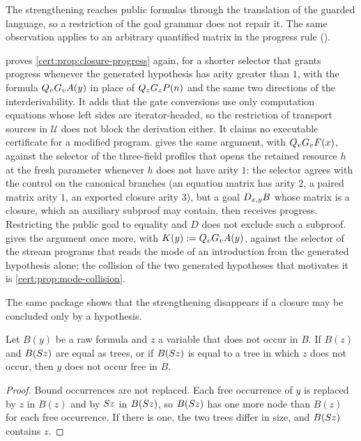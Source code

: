 The strengthening reaches public formulas through the translation of the
guarded language, so a restriction of the goal grammar does not repair it.
The same observation applies to an arbitrary quantified matrix in the
progress rule ().

\begin{remark}\label{cert:rem:closure-progress-sources}
 proves \cref{cert:prop:closure-progress} again,
for a shorter selector that grants progress whenever the generated hypothesis
has arity greater than $1$, with the formula $Q_{v}G_vA(y)$ in place of
$Q_{z}G_zP(n)$ and the same two directions of the interderivability. It adds
that the gate conversions use only computation equations whose left sides are
iterator-headed, so the restriction of transport sources in $\mathcal U$ does
not block the derivation either. It claims no executable certificate for a
modified program.  gives the same argument, with
$Q_{v}G_vF(x)$, against the selector of the three-field profiles that opens
the retained resource $h$ at the fresh parameter whenever $h$ does not have
arity $1$: the selector agrees with the control on the canonical branches
(an equation matrix has arity $2$, a paired matrix arity $1$, an exported
closure arity $3$), but a goal $D_{x,y}B$ whose matrix is a closure, which an
auxiliary subproof may contain, then receives progress. Restricting the
public goal to equality and $D$ does not exclude such a subproof.
 gives the argument once more, with
$K(y)\mathrel{:=}Q_{v}G_vA(y)$, against the selector of the stream programs that
reads the mode of an introduction from the generated hypothesis alone; the
collision of the two generated hypotheses that motivates it is
\cref{cert:prop:mode-collision}.
\end{remark}

The same package shows that the strengthening disappears if a closure may be
concluded only by a hypothesis.

\begin{lemma}\label{cert:lem:rigidity}
Let $B(y)$ be a raw formula and $z$ a variable that does not occur in $B$. If
$B(z)$ and $B(S z)$ are equal as trees, or if $B(S z)$ is equal to a tree
in which $z$ does not occur, then $y$ does not occur free in $B$.
\end{lemma}
\begin{proof}
Bound occurrences are not replaced. Each free occurrence of $y$ is replaced by
$z$ in $B(z)$ and by $S z$ in $B(S z)$, so $B(S z)$ has one more node
than $B(z)$ for each free occurrence. If there is one, the two trees differ in
size, and $B(S z)$ contains $z$.
\end{proof}

